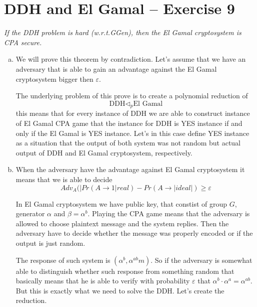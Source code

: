 \documentclass[a4paper,10pt]{article}
\begin{document}
\section*{DDH and El Gamal -- Exercise 9}
\textit{If the DDH problem is hard (w.r.t.GGen), then the El Gamal cryptosystem is CPA secure.}
\begin{enumerate}[a)]
\item We will prove this theorem by contradiction. Let's assume that we have an adversary that is able to gain an advantage against the El Gamal cryptosystem bigger then $\varepsilon$.


The underlying problem of this prove is to create a polynomial reduction of
$$
\text{DDH} \vartriangleleft_p \text{El Gamal}
$$
this means that for every instance of DDH we are able to construct instance of El Gamal CPA  game that the instance for DDH is YES instance if and only if the El Gamal is YES instance. Let's in this case define YES instance as a situation that the output of both system was not random but actual output of DDH and El Gamal cryptosystem, respectively.

\item 
When the adversary have the advantage against El Gamal cryptosystem it means that we is able to decide
$$
Adv_A(|Pr(A\rightarrow1|real) - Pr(A\rightarrow|ideal|) \geq \varepsilon
$$

In El Gamal cryptosystem we have public key, that constist of group $G$, generator $\alpha$ and $\beta = \alpha^b$. Playing the CPA game means that the adversary is allowed to choose plaintext message and the system replies. Then the adversary have to decide whether the message was properly encoded or if the output is just random.

The response of such system is $(\alpha^b, \alpha^{ab}m)$. So if the adversary is somewhat able to distinguish whether such response  from something random that basically means that he is able to verify with probability $\varepsilon$ that $\alpha^b \cdot \alpha^a = \alpha^{ab}$. But this is exactly what we need to solve the DDH. Let's create the reduction.


\end{enumerate}
\end{document}

